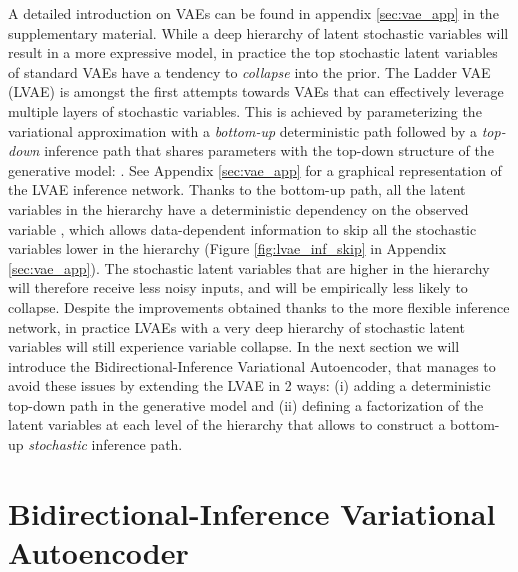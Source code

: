 \documentclass{article}
\def\name{Bidirectional-Inference Variational Autoencoder}
\begin{document}
A detailed introduction on VAEs can be found in appendix \ref{sec:vae_app} in the supplementary material. While a deep hierarchy of latent stochastic variables will result in a more expressive model, in practice the top stochastic latent variables of standard VAEs have a tendency to \textit{collapse} into the prior.
The Ladder VAE (LVAE) \citep{Sonderby2016} is amongst the first attempts towards VAEs that can effectively leverage multiple layers of stochastic variables. This is achieved by parameterizing the variational approximation with a \textit{bottom-up} deterministic path followed by a \textit{top-down} inference path that shares parameters with the top-down structure of the generative model: .
See Appendix \ref{sec:vae_app} for a graphical representation of the LVAE inference network.
Thanks to the bottom-up path, all the latent variables in the hierarchy have a deterministic dependency on the observed variable , which allows data-dependent information to skip all the stochastic variables lower in the hierarchy (Figure \ref{fig:lvae_inf_skip} in Appendix \ref{sec:vae_app}).
The stochastic latent variables that are higher in the hierarchy will therefore receive less noisy inputs, and will be empirically less likely to collapse.
Despite the improvements obtained thanks to the more flexible inference network, in practice LVAEs with a very deep hierarchy of stochastic latent variables will still experience variable collapse. In the next section we will introduce the \name, that manages to avoid these issues by extending the LVAE in 2 ways: (i) adding a deterministic top-down path in the generative model and (ii) defining a factorization of the latent variables  at each level of the hierarchy that allows to construct a bottom-up \textit{stochastic} inference path.


\section{\name}
\end{document}
